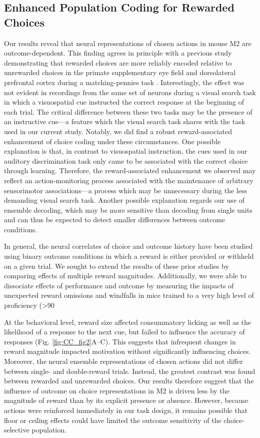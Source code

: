 \subsection{Enhanced Population Coding for Rewarded Choices}
Our results reveal that neural representations of chosen actions in mouse M2 are outcome-dependent. This finding agrees in principle with a previous study demonstrating that rewarded choices are more reliably encoded relative to unrewarded choices in the primate supplementary eye field and dorsolateral prefrontal cortex during a matching-pennies task \citep{donahue2013cortical}. Interestingly, the effect was not evident in recordings from the same set of neurons during a visual search task in which a visuospatial cue instructed the correct response at the beginning of each trial. The critical difference between these two tasks may be the presence of an instructive cue—a feature which the visual search task shares with the task used in our current study. Notably, we did find a robust reward-associated enhancement of choice coding under these circumstances. One possible explanation is that, in contrast to visuospatial instruction, the cues used in our auditory discrimination task only came to be associated with the correct choice through learning. Therefore, the reward-associated enhancement we observed may reflect an action-monitoring process associated with the maintenance of arbitrary sensorimotor associations—a process which may be unnecessary during the less demanding visual search task. Another possible explanation regards our use of ensemble decoding, which may be more sensitive than decoding from single units and can thus be expected to detect smaller differences between outcome conditions.

In general, the neural correlates of choice and outcome history have been studied using binary outcome conditions in which a reward is either provided or withheld on a given trial. We sought to extend the results of these prior studies by comparing effects of multiple reward magnitudes. Additionally, we were able to dissociate effects of performance and outcome by measuring the impacts of unexpected reward omissions and windfalls in mice trained to a very high level of proficiency (>90%

At the behavioral level, reward size affected consummatory licking as well as the likelihood of a response to the next cue, but failed to influence the accuracy of responses (Fig. \ref{fig:CC_fig2}A–C). This suggests that infrequent changes in reward magnitude impacted motivation without significantly influencing choices. Moreover, the neural ensemble representations of chosen actions did not differ between single- and double-reward trials. Instead, the greatest contrast was found between rewarded and unrewarded choices. Our results therefore suggest that the influence of outcome on choice representations in M2 is driven less by the magnitude of reward than by its explicit presence or absence. However, because actions were reinforced immediately in our task design, it remains possible that floor or ceiling effects could have limited the outcome sensitivity of the choice-selective population.

